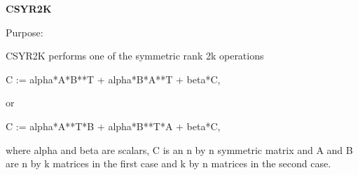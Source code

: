 {\bfseries C\+S\+Y\+R2\+K} 

\begin{DoxyParagraph}{Purpose\+: }
\begin{DoxyVerb} CSYR2K  performs one of the symmetric rank 2k operations

    C := alpha*A*B**T + alpha*B*A**T + beta*C,

 or

    C := alpha*A**T*B + alpha*B**T*A + beta*C,

 where  alpha and beta  are scalars,  C is an  n by n symmetric matrix
 and  A and B  are  n by k  matrices  in the  first  case  and  k by n
 matrices in the second case.\end{DoxyVerb}
 
\end{DoxyParagraph}

